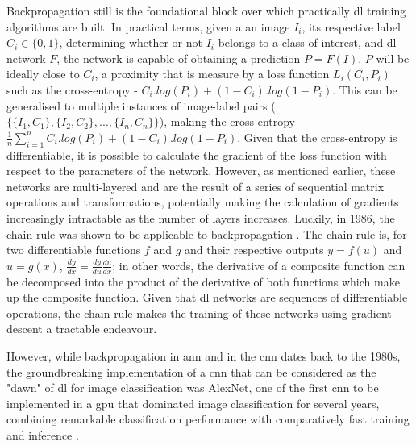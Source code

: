 \begin{figure}
	\label{fig:cnn}
\end{figure}

Backpropagation still is the foundational block over which practically \ac{dl} training algorithms are built. In practical terms, given a an image $I_i$, its respective label $C_i \in \{0,1\}$, determining whether or not $I_i$ belongs to a class of interest, and \ac{dl} network $F$, the network is capable of obtaining a prediction $P = F(I)$. $P$ will be ideally close to $C_i$, a proximity that is measure by a loss function $L_i(C_i,P_i)$ such as the cross-entropy - $C_i.log(P_i) + (1-C_i).log(1-P_i)$. This can be generalised to multiple instances of image-label pairs ($\{\{I_1,C_1\},\{I_2,C_2\},...,\{I_n,C_n\}\}$), making the cross-entropy $\frac{1}{n}\sum_{i=1}^{n}C_i.log(P_i) + (1-C_i).log(1-P_i)$. Given that the cross-entropy is differentiable, it is possible to calculate the gradient of the loss function with respect to the parameters of the network. However, as mentioned earlier, these networks are multi-layered and are the result of a series of sequential matrix operations and transformations, potentially making the calculation of gradients increasingly intractable as the number of layers increases. Luckily, in 1986, the chain rule was shown to be applicable to backpropagation \cite{Rumelhart1986-tl}. The chain rule is, for two differentiable functions $f$ and $g$ and their respective outputs $y = f(u)$ and $u = g(x)$, $\frac{dy}{dx} = \frac{dy}{du}\frac{du}{dx}$; in other words, the derivative of a composite function can be decomposed into the product of the derivative of both functions which make up the composite function. Given that \ac{dl} networks are sequences of differentiable operations, the chain rule makes the training of these networks using gradient descent a tractable endeavour. 

However, while backpropagation in \ac{ann} and in the \ac{cnn} dates back to the 1980s, the groundbreaking implementation of a \ac{cnn} that can be considered as the "dawn" of \ac{dl} for image classification was AlexNet, one of the first \ac{cnn} to be implemented in a \ac{gpu} that dominated image classification for several years, combining remarkable classification performance with comparatively fast training and inference \cite{Krizhevsky2012-by}. 

